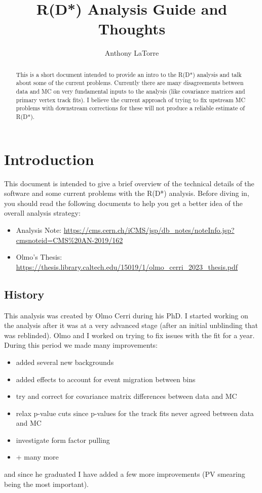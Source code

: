 \documentclass[12pt]{report}
\title{R(D*) Analysis Guide and Thoughts}
\author{Anthony LaTorre}
\begin{document}
\maketitle
\tableofcontents
\begin{abstract}
This is a short document intended to provide an intro to the R(D*) analysis and
talk about some of the current problems. Currently there are many
disagreements between data and MC on very fundamental inputs to the analysis
(like covariance matrices and primary vertex track fits). I believe the current
approach of trying to fix upstream MC problems with downstream corrections for
these will not produce a reliable estimate of R(D*).
\end{abstract}
\chapter{Introduction}
This document is intended to give a brief overview of the technical details of
the software and some current problems with the R(D*) analysis. Before diving
in, you should read the following documents to help you get a better idea of
the overall analysis strategy:
\begin{itemize}
\item Analysis Note: \url{https://cms.cern.ch/iCMS/jsp/db_notes/noteInfo.jsp?cmsnoteid=CMS%20AN-2019/162}
\item Olmo's Thesis: \url{https://thesis.library.caltech.edu/15019/1/olmo_cerri_2023_thesis.pdf}
\end{itemize}
\section{History}
This analysis was created by Olmo Cerri during his PhD. I started working on
the analysis after it was at a very advanced stage (after an initial unblinding
that was reblinded). Olmo and I worked on trying to fix issues with the fit for
a year. During this period we made many improvements:
\begin{itemize}
\item added several new backgrounds
\item added effects to account for event migration between bins
\item try and correct for covariance matrix differences between data and MC
\item relax p-value cuts since p-values for the track fits never agreed between data and MC
\item investigate form factor pulling
\item + many more
\end{itemize}
and since he graduated I have added a few more improvements (PV smearing being
the most important).
\end{document}
